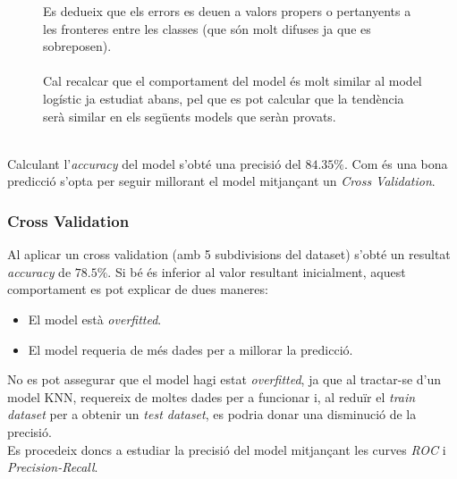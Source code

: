 \documentclass[a4paper, 11pt]{article}
\begin{document}
\begin{figure}[h]
\begin{minipage}{7cm}
Es dedueix que els errors es deuen a valors propers o pertanyents a les fronteres entre les classes (que són molt difuses ja que es sobreposen).\\\\
Cal recalcar que el comportament del model és molt similar al model logístic ja estudiat abans, pel que es pot calcular que la tendència serà similar en els següents models que seràn provats.
\end{minipage} %
\end{figure} %
\\
Calculant l'\textit{accuracy} del model s'obté una precisió del $84.35\%$. Com és una bona predicció s'opta per seguir millorant el model mitjançant un \textit{Cross Validation}.


\subsubsection{Cross Validation}
Al aplicar un cross validation (amb 5 subdivisions del dataset) s’obté un resultat \textit{accuracy}
de $78.5\%$. Si bé és inferior al valor resultant inicialment, aquest comportament es pot explicar de dues maneres:
\begin{itemize}
    \item El model està \textit{overfitted}.
    \item El model requeria de més dades per a millorar la predicció.
\end{itemize}
No es pot assegurar que el model hagi estat \textit{overfitted}, ja que al tractar-se d'un model KNN, requereix de moltes dades per a funcionar i, al reduïr el \textit{train dataset} per a obtenir un \textit{test dataset}, es podria donar una disminució de la precisió.\\
Es procedeix doncs a estudiar la precisió del model mitjançant les curves \textit{ROC} i \textit{Precision-Recall}.
\newpage
\end{document}

